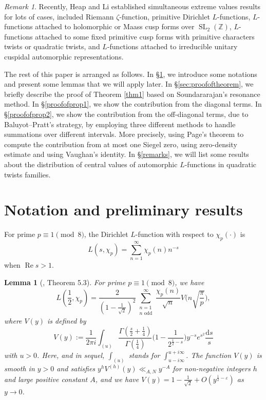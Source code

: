 \documentclass[12pt,reqno]{amsart}
\numberwithin{equation}{section}
\theoremstyle{plain}
\newtheorem{lemma}[theorem]{Lemma}
\theoremstyle{definition}
\theoremstyle{remark}
\newtheorem{remark}[theorem]{Remark}
\renewcommand{\Re}{\operatorname{Re}}
\newcommand{\SL}{\operatorname{SL}}
\newcommand{\dd}{\mathrm{d}}
\begin{document}
\begin{remark}
  Recently, Heap and Li\cite{HL23} established simultaneous extreme values results for lots of cases, included Riemann $\zeta$-function, primitive Dirichlet $L$-functions, $L$-functions attached to holomorphic or Maass cusp forms over $\SL_2(\mathbb{Z})$,
  $L$-functions attached to some fixed primitive cusp forms with primitive characters twists or quadratic twists, and $L$-functions attached to irreducible unitary cuspidal automorphic representations.
\end{remark}



The rest of this paper is arranged as follows.
In \S \ref{sec:preliminaries}, we introduce some notations and present some lemmas that we will apply later.
In \S \ref{sec:proofoftheorem}, we briefly describe the proof of Theorem \ref{thm1} based on Soundararajan's resonance method.
In \S \ref{proofofprop1}, we show the contribution from the diagonal terms.
In \S \ref{proofofprop2}, we show the contribution from the off-diagonal terms, due to Baluyot--Pratt's strategy, by employing three different methods to handle summations over different intervals.
More precisely, using Page's theorem to compute the contribution from at most one Siegel zero, using zero-density estimate and using Vaughan's identity.
In \S \ref{remarks}, we will list some
results about the distribution of central values of automorphic $L$-functions in quadratic twists families.

\section{Notation and preliminary results}\label{sec:preliminaries}

For prime $p\equiv 1\pmod 8$, the Dirichlet $L$-function with respect to $\chi_p(\cdot)$ is
\begin{equation*}\label{def:dirichletlfun}
  L(s,\chi_p)=\sum_{n=1}^{\infty}\chi_p(n)n^{-s}
\end{equation*}
when $\Re s>1$.

\begin{lemma}[\cite{IK04}, Theorem 5.3] \label{lemma:AFE}
For prime $p\equiv 1\pmod 8$, we have
\begin{equation*}
  L(\frac{1}{2},\chi_{p})
  =\frac{2}{(1-\frac{1}{\sqrt{2}})^{2}}
  \sum_{\substack{n=1 \\ n \text{ odd} }}^\infty
  \frac{\chi_p(n)}{\sqrt{n}}
  V\bigg(n\sqrt{\frac{\pi}{p}}\bigg),
 \end{equation*}
where $V(y)$ is defined by
\begin{equation*} \label{eqn:V}
V(y):=\frac{1}{2\pi i}\int_{(u)}
\frac{\Gamma(\frac{s}{2}+\frac{1}{4})}
{\Gamma(\frac{1}{4})}
\bigg(1-\frac{1}{2^{\frac{1}{2}-s}}\bigg)
y^{-s} e^{s^2} \frac{\dd s}{s}
\end{equation*}
with $u>0$.  Here, and in sequel, $\int_{(u)}$ stands for $\int_{u-i \infty}^{u+i \infty}$.
The function $V(y)$ is smooth in $y>0$ and satisfies $y^hV^{(h)}(y)\ll_{A,N} y^{-A}$ for non-negative integers $h$ and large positive constant $A$, and we have $V(y)=1-\frac{1}{\sqrt{2}}+O(y^{\frac{1}{2}-\varepsilon})$ as $y\to 0$.
\end{lemma}
\end{document}
